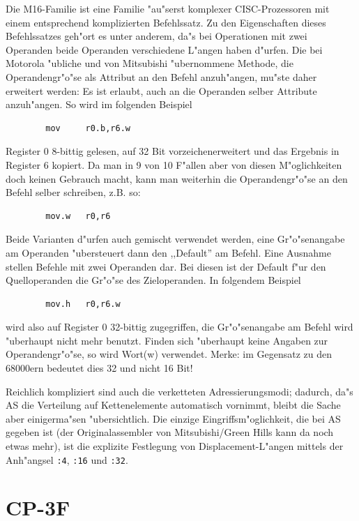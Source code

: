 \documentclass[12pt,a4paper,twoside]{report}
\newcommand{\tty}[1]{{\tt #1}}
\newcommand{\asname}{AS}
\begin{document}
Die M16-Familie ist eine Familie "au"serst komplexer CISC-Prozessoren
mit einem entsprechend komplizierten Befehlssatz.  Zu den Eigenschaften
dieses Befehlssatzes geh"ort es unter anderem, da"s bei Operationen
mit zwei Operanden beide Operanden verschiedene L"angen haben d"urfen.
Die bei Motorola "ubliche und von Mitsubishi "ubernommene Methode, die
Operandengr"o"se als Attribut an den Befehl anzuh"angen, mu"ste daher
erweitert werden: Es ist erlaubt, auch an die Operanden selber Attribute
anzuh"angen.  So wird im folgenden Beispiel
\begin{verbatim}
        mov     r0.b,r6.w
\end{verbatim}
Register 0 8-bittig gelesen, auf 32 Bit vorzeichenerweitert und das
Ergebnis in Register 6 kopiert.  Da man in 9 von 10 F"allen aber von
diesen M"oglichkeiten doch keinen Gebrauch macht, kann man weiterhin
die Operandengr"o"se an den Befehl selber schreiben, z.B. so:
\begin{verbatim}
        mov.w   r0,r6
\end{verbatim}
Beide Varianten d"urfen auch gemischt verwendet werden, eine
Gr"o"senangabe am Operanden "ubersteuert dann den ,,Default'' am Befehl.
Eine Ausnahme stellen Befehle mit zwei Operanden dar.   Bei diesen ist
der Default f"ur den Quelloperanden die Gr"o"se des Zieloperanden. In
folgendem Beispiel
\begin{verbatim}
        mov.h   r0,r6.w
\end{verbatim}
wird also auf Register 0 32-bittig zugegriffen, die Gr"o"senangabe
am Befehl wird "uberhaupt nicht mehr benutzt.  Finden sich "uberhaupt
keine Angaben zur Operandengr"o"se, so wird Wort(w) verwendet.  Merke:
im Gegensatz zu den 68000ern bedeutet dies 32 und nicht 16 Bit!
\par
Reichlich kompliziert sind auch die verketteten Adressierungsmodi;
dadurch, da"s \asname{} die Verteilung auf Kettenelemente automatisch
vornimmt, bleibt die Sache aber einigerma"sen "ubersichtlich.  Die
einzige Eingriffsm"oglichkeit, die bei \asname{} gegeben ist (der Originalassembler
von Mitsubishi/Green Hills kann da noch etwas mehr), ist die explizite
Festlegung von Displacement-L"angen mittels der Anh"angsel \tty{:4},
\tty{:16} und \tty{:32}.


\section{CP-3F}
\end{document}
